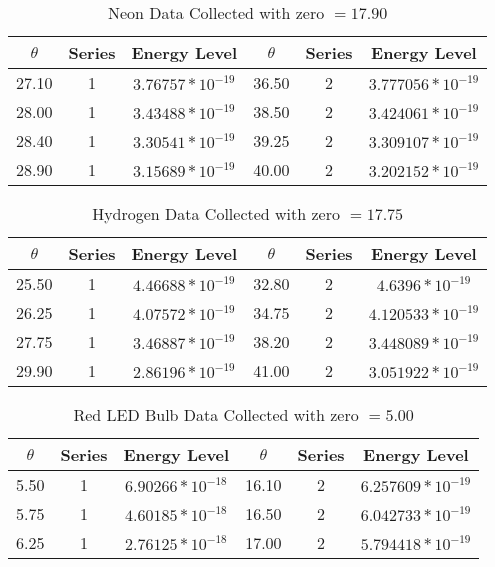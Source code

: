 \documentclass{article}
\begin{document}
    \begin{longtable}[c]{|c c c || c c c|}
        \caption{Neon Data Collected with zero $ = 17.90$ \label{long}}\\
        \hline
        $\theta$ & Series & Energy Level  & $\theta$ & Series & Energy Level\\
        \hline
        27.10 & 1 & $3.76757 * 10^{-19}$ & 36.50 & 2 & $3.777056 * 10^{-19}$\\
        28.00 & 1 & $3.43488 * 10^{-19}$ & 38.50 & 2 & $3.424061 * 10^{-19}$\\
        28.40 & 1 & $3.30541 * 10^{-19}$ & 39.25 & 2 & $3.309107 * 10^{-19}$\\
        28.90 & 1 & $3.15689 * 10^{-19}$ & 40.00 & 2 & $3.202152 * 10^{-19}$\\
        \hline
    \end{longtable}
    \begin{longtable}[c]{|c c c|| c c c|}
        \caption{Hydrogen Data Collected with zero $ = 17.75$ \label{long}}\\
        \hline
        $\theta$ & Series & Energy Level  & $\theta$ & Series & Energy Level\\
        \hline
        25.50 & 1 & $4.46688 * 10^{-19}$ & 32.80 & 2 & $4.6396 * 10^{-19}$\\
        26.25 & 1 & $4.07572 * 10^{-19}$ & 34.75 & 2 & $4.120533 * 10^{-19}$\\
        27.75 & 1 & $3.46887 * 10^{-19}$ & 38.20 & 2 & $3.448089 * 10^{-19}$\\
        29.90 & 1 & $2.86196 * 10^{-19}$ & 41.00 & 2 & $3.051922 * 10^{-19}$\\
        \hline
    \end{longtable}
    \begin{longtable}[c]{| c c c || c c c|}
        \caption{Red LED Bulb Data Collected with zero $ = 5.00$ \label{long}}\\
        \hline
        $\theta$ & Series & Energy Level  & $\theta$ & Series & Energy Level\\
        \hline
        5.50 & 1 & $6.90266 * 10^{-18}$ & 16.10 & 2 & $6.257609 * 10^{-19}$\\
        5.75 & 1 & $4.60185 * 10^{-18}$ & 16.50 & 2 & $6.042733 * 10^{-19}$\\
        6.25 & 1 & $2.76125 * 10^{-18}$ & 17.00 & 2 & $5.794418 * 10^{-19}$\\
        \hline
    \end{longtable}
\end{document}
